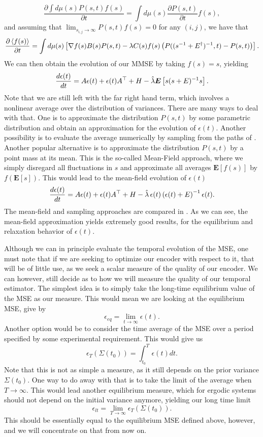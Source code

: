 \[
\frac{\partial \int d\mu(s) P(s,t) f(s)}{\partial t} = \int d\mu(s) \frac{\partial P(s,t)}{\partial t} f(s),
\]
and assuming that $\lim_{s_{i,j} \to \infty} P(s,t) f(s) = 0$ for any $(i,j)$, we have that
\[
\frac{\partial \left<f(s)\right>}{\partial t} = \int d\mu(s) \left[\nabla f(s) B(s) P(s,t) - \lambda C(s) f(s) \left(P((s^{-1} + E^\dagger)^{-1},t)  -P(s,t)\right)\right].
\]
We can then obtain the evolution of our MMSE by taking $f(s) = s$, yielding
\begin{equation}
\label{eq:epsilon_exact}
\frac{d\epsilon(t)}{dt} = A\epsilon(t) + \epsilon(t) A^\top + H -\hat{\lambda} \boldsymbol{E}\left[s (s+\covar)^{-1} s\right].
\end{equation}
Note that we are still left with the far right hand term, which involves a nonlinear average over the distribution of variances. There are many ways to deal with that. One is to approximate the distribution $P(s,t)$ by some parametric distribution and obtain an approximation for the evolution of $\epsilon(t)$. Another possibility is to evaluate the average numerically by sampling from the paths of . Another popular alternative is to approximate the distribution $P(s,t)$ by a point mass at its mean. This is the so-called Mean-Field approach, where we simply disregard all fluctuations in $s$ and approximate all averages $\boldsymbol{E}[f(s)]$ by $f(\boldsymbol{E}[s])$. This would lead to the mean-field evolution of $\epsilon(t)$
\begin{equation}
\frac{d\epsilon(t)}{dt} = A\epsilon(t) + \epsilon(t) A^\top + H -\hat{\lambda} \,\epsilon(t) \left(\epsilon(t)+E\right)^{-1} \epsilon(t).
\end{equation}
The mean-field and sampling approaches are compared in . As we can see, the mean-field approximation yields extremely good results, for the equilibrium and relaxation behavior of $\epsilon(t)$.\par
Although we can in principle evaluate the temporal evolution of the MSE, one must note that if we are seeking to optimize our encoder with respect to it, that will be of little use, as we seek a scalar measure of the quality of our encoder. We can however, still decide as to how we will measure the quality of our temporal estimator. The simplest idea is to simply take the long-time equilibrium value of the MSE as our measure. This would mean we are looking at the equilibrium MSE, give by
\[
\epsilon_{eq} = \lim_{t\to\infty} \epsilon(t).
\]
Another option would be to consider the time average of the MSE over a period specified by some experimental requirement. This would give us
\[
\epsilon_{T}\left(\Sigma(t_0)\right) = \int_{t_0}^T \epsilon(t) dt.
\]
Note that this is not as simple a measure, as it still depends on the prior variance $\Sigma(t_0)$. One way to do away with that is to take the limit of the average when $T\to\infty$. This would lead another equilibrium measure, which for ergodic systems should not depend on the initial variance anymore, yielding our long time limit
\[
\epsilon_{lt} = \lim_{T\to\infty}\epsilon_T \left(\Sigma(t_0)\right).
\]
This should be essentially equal to the equilibrium MSE defined above, however, and we will concentrate on that from now on.
\par
